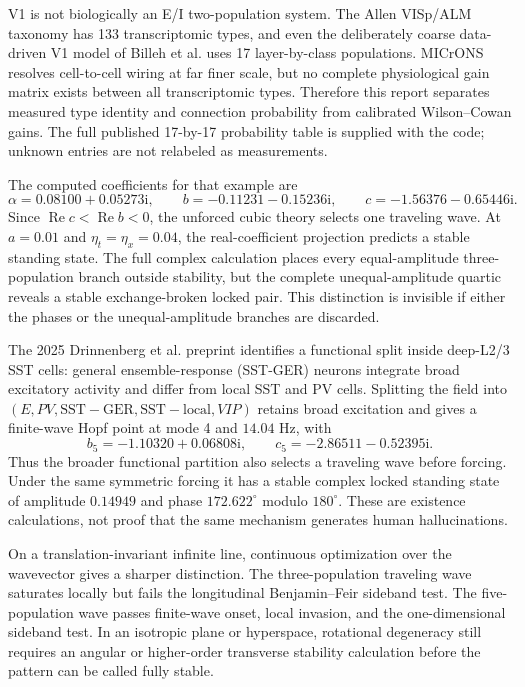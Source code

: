 \documentclass[11pt]{article}
\newcommand{\ii}{\mathrm{i}}
\newcommand{\RePart}{\operatorname{Re}}
\begin{document}
V1 is not biologically an E/I two-population system.  The Allen VISp/ALM
taxonomy has 133 transcriptomic types, and even the deliberately coarse
data-driven V1 model of Billeh et al. uses 17 layer-by-class populations.
MICrONS resolves cell-to-cell wiring at far finer scale, but no complete
physiological gain matrix exists between all transcriptomic types.  Therefore
this report separates measured type identity and connection probability from
calibrated Wilson--Cowan gains.  The full published 17-by-17 probability table
is supplied with the code; unknown entries are not relabeled as measurements.

The computed coefficients for that example are
\begin{equation}
 \alpha=0.08100+0.05273\ii,\qquad
 b=-0.11231-0.15236\ii,\qquad
 c=-1.56376-0.65446\ii.
 \label{eq:numerical-coefficients}
\end{equation}
Since $\RePart c<\RePart b<0$, the unforced cubic theory selects one traveling
wave.  At $a=0.01$ and $\eta_t=\eta_x=0.04$, the real-coefficient projection
predicts a stable standing state.  The full complex calculation places every
equal-amplitude three-population branch outside stability, but the complete
unequal-amplitude quartic reveals a stable exchange-broken locked pair.  This
distinction is invisible if either the phases or the unequal-amplitude
branches are discarded.

The 2025 Drinnenberg et al. preprint identifies a functional split inside
deep-L2/3 SST cells: general ensemble-response (SST-GER) neurons integrate
broad excitatory activity and differ from local SST and PV cells.  Splitting
the field into
$(E,PV,\mathrm{SST\!-\!GER},\mathrm{SST\!-\!local},VIP)$ retains broad
excitation and gives a finite-wave Hopf point at mode 4 and $14.04$ Hz, with
\begin{equation}
 b_5=-1.10320+0.06808\ii,\qquad
 c_5=-2.86511-0.52395\ii.
 \label{eq:five-coefficients}
\end{equation}
Thus the broader functional partition also selects a traveling wave before
forcing.  Under the same symmetric forcing it has a stable complex locked
standing state of amplitude $0.14949$ and phase $172.622^\circ$ modulo
$180^\circ$.  These are existence calculations, not proof that the same
mechanism generates human hallucinations.

On a translation-invariant infinite line, continuous optimization over the
wavevector gives a sharper distinction.  The three-population traveling wave
saturates locally but fails the longitudinal Benjamin--Feir sideband test.
The five-population wave passes finite-wave onset, local invasion, and the
one-dimensional sideband test.  In an isotropic plane or hyperspace,
rotational degeneracy still requires an angular or higher-order transverse
stability calculation before the pattern can be called fully stable.
\end{document}
